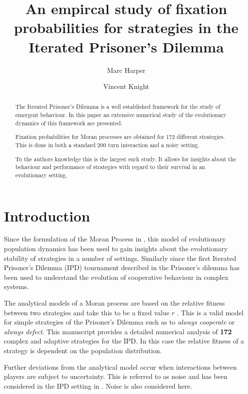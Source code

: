 \documentclass{article}
\title{An empircal study of fixation probabilities for strategies in the
       Iterated Prisoner's Dilemma}
\author{Marc Harper \and Vincent Knight} %
\date{}
\begin{document}
\maketitle

\begin{abstract}
    The Iterated Prisoner's Dilemma is a well established framework for
    the study of emergent behaviour. In this paper an extensive numerical
    study of the evolutionary dynamics of this framework are presented.

    Fixation probabilities for Moran processes are obtained for 172
    different strategies. This is done in both a standard 200 turn
    interaction and a noisy setting.

    To the authors knowledge this is the largest
    such study. It allows for insights about the behaviour and
    performance of strategies with regard to their survival in an
    evolutionary setting.
\end{abstract}  %

\section{Introduction}\label{sec:introduction}

Since the formulation of the Moran Process in \cite{Moran1957}, this model of
evolutionary population dynamics has been used to gain insights about the
evolutionary stability of strategies in a number of settings. Similarly since
the first Iterated Prisoner's Dilemma (IPD) tournament described in
\cite{Axelrod1980a} the Prisoner's dilemma has been used to understand the
evolution of cooperative behaviour in complex systems.

The analytical models of a Moran process are based on the relative fitness
between two strategies and take this to be a fixed value \(r\) \cite{Nowak}.
This is a valid model for simple strategies of the Prisoner's Dilemma such as to
\textit{always cooperate} or \textit{always defect}. This manuscript provides a
detailed numerical analysis of \textbf{172} complex and adaptive strategies for
the IPD\@. In this case the relative fitness of a strategy is dependent on the
population distribution.

Further deviations from the analytical model occur when interactions between
players are subject to uncertainty. This is referred to as noise and has been
considered in the IPD setting in \cite{Bendor1993, Nowak1993, Wu1995}. Noise is
also considered here.
\end{document}
